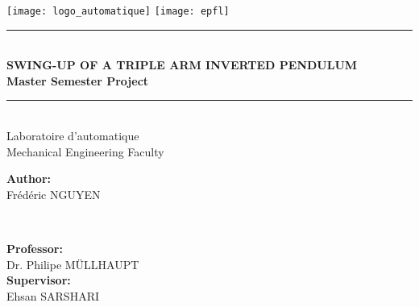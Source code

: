 \begin{titlepage}

\newcommand{\HRule}{\rule{\linewidth}{0.5mm}} %


\center %
\texttt{[image: logo\_automatique]}
\hfill
\texttt{[image: epfl]}\\[4.5cm]




\HRule \\[0.2cm]
\sffamily
{\LARGE\bfseries \uppercase{Swing-up of a triple arm inverted pendulum}} \\[0.05cm]
{\Large\bfseries Master Semester Project}
\HRule \\[0.5cm]
 

{\Large Laboratoire d'automatique}\\[0.1cm] %
{\large Mechanical Engineering Faculty}\\[4.5cm] %

\begin{minipage}{0.45\textwidth}
    \begin{flushleft}
        \textbf{Author:}\\
        Frédéric NGUYEN
    \end{flushleft}
\end{minipage}
~
\begin{minipage}{0.45\textwidth}
    \begin{flushright}
        \textbf{Professor:} \\
        Dr. Philipe MÜLLHAUPT\\
        \textbf{Supervisor:}\\
        Ehsan SARSHARI
    \end{flushright}
\end{minipage}\\[2cm]


\end{titlepage}

